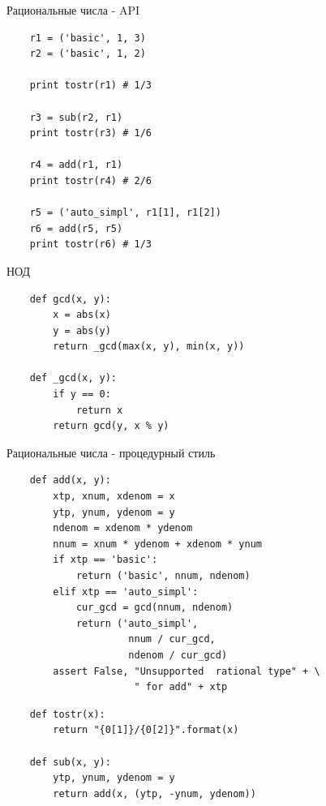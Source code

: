 \documentclass{article}
\begin{document}
\begin{center} Рациональные числа - API \end{center}
\begin{lstlisting}
    r1 = ('basic', 1, 3)
    r2 = ('basic', 1, 2)

    print tostr(r1) # 1/3

    r3 = sub(r2, r1)
    print tostr(r3) # 1/6

    r4 = add(r1, r1)
    print tostr(r4) # 2/6

    r5 = ('auto_simpl', r1[1], r1[2])
    r6 = add(r5, r5)
    print tostr(r6) # 1/3
\end{lstlisting}
\newpage

\begin{center}НОД\end{center}
\begin{lstlisting}
    def gcd(x, y):
        x = abs(x)
        y = abs(y)
        return _gcd(max(x, y), min(x, y))

    def _gcd(x, y):
        if y == 0:
            return x
        return gcd(y, x % y)
\end{lstlisting}
\newpage

\begin{center}Рациональные числа - процедурный стиль\end{center}
\begin{lstlisting}
    def add(x, y):
        xtp, xnum, xdenom = x
        ytp, ynum, ydenom = y
        ndenom = xdenom * ydenom
        nnum = xnum * ydenom + xdenom * ynum
        if xtp == 'basic':
            return ('basic', nnum, ndenom)
        elif xtp == 'auto_simpl':
            cur_gcd = gcd(nnum, ndenom)
            return ('auto_simpl', 
                     nnum / cur_gcd, 
                     ndenom / cur_gcd)
        assert False, "Unsupported  rational type" + \
                      " for add" + xtp
\end{lstlisting}
\newpage

\begin{lstlisting}
    def tostr(x): 
        return "{0[1]}/{0[2]}".format(x)

    def sub(x, y):
        ytp, ynum, ydenom = y
        return add(x, (ytp, -ynum, ydenom))
\end{lstlisting}
\newpage
\end{document}
